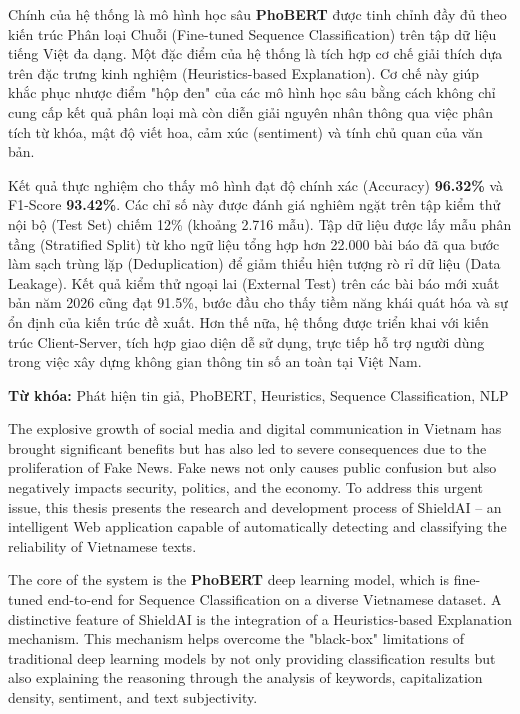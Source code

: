 \documentclass[12pt,a4paper]{article}
\begin{document}
Chính của hệ thống là mô hình học sâu \textbf{PhoBERT} được tinh chỉnh đầy đủ theo kiến trúc Phân loại Chuỗi (Fine-tuned Sequence Classification) trên tập dữ liệu tiếng Việt đa dạng. Một đặc điểm của hệ thống là tích hợp cơ chế giải thích dựa trên đặc trưng kinh nghiệm (Heuristics-based Explanation). Cơ chế này giúp khắc phục nhược điểm "hộp đen" của các mô hình học sâu bằng cách không chỉ cung cấp kết quả phân loại mà còn diễn giải nguyên nhân thông qua việc phân tích từ khóa, mật độ viết hoa, cảm xúc (sentiment) và tính chủ quan của văn bản.

Kết quả thực nghiệm cho thấy mô hình đạt độ chính xác (Accuracy) \textbf{96.32\%} và F1-Score \textbf{93.42\%}. Các chỉ số này được đánh giá nghiêm ngặt trên tập kiểm thử nội bộ (Test Set) chiếm 12\% (khoảng 2.716 mẫu). Tập dữ liệu được lấy mẫu phân tầng (Stratified Split) từ kho ngữ liệu tổng hợp hơn 22.000 bài báo đã qua bước làm sạch trùng lặp (Deduplication) để giảm thiểu hiện tượng rò rỉ dữ liệu (Data Leakage). Kết quả kiểm thử ngoại lai (External Test) trên các bài báo mới xuất bản năm 2026 cũng đạt 91.5\%, bước đầu cho thấy tiềm năng khái quát hóa và sự ổn định của kiến trúc đề xuất. Hơn thế nữa, hệ thống được triển khai với kiến trúc Client-Server, tích hợp giao diện dễ sử dụng, trực tiếp hỗ trợ người dùng trong việc xây dựng không gian thông tin số an toàn tại Việt Nam.

\vspace{0.65cm}
\textbf{Từ khóa:} Phát hiện tin giả, PhoBERT, Heuristics, Sequence Classification, NLP
\newpage

\begin{center}\vspace*{2.5cm}{\bfseries\Large ABSTRACT}\end{center}
\vspace{0.5cm}
The explosive growth of social media and digital communication in Vietnam has brought significant benefits but has also led to severe consequences due to the proliferation of Fake News. Fake news not only causes public confusion but also negatively impacts security, politics, and the economy. To address this urgent issue, this thesis presents the research and development process of ShieldAI – an intelligent Web application capable of automatically detecting and classifying the reliability of Vietnamese texts.

The core of the system is the \textbf{PhoBERT} deep learning model, which is fine-tuned end-to-end for Sequence Classification on a diverse Vietnamese dataset. A distinctive feature of ShieldAI is the integration of a Heuristics-based Explanation mechanism. This mechanism helps overcome the "black-box" limitations of traditional deep learning models by not only providing classification results but also explaining the reasoning through the analysis of keywords, capitalization density, sentiment, and text subjectivity.
\end{document}
